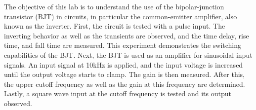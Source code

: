The objective of this lab is to understand the use of the bipolar-junction transistor (BJT) in circuits, in particular the common-emitter amplifier, also known as the inverter. First, the circuit is tested with a pulse input. The inverting behavior as well as the transients are observed, and the time delay, rise time, and fall time are measured. This experiment demonstrates the switching capabilities of the BJT. Next, the BJT is used as an amplifier for sinusoidal input signals. An input signal at 10kHz is applied, and the input voltage is increased until the output voltage starts to clamp. The gain is then measured. After this, the upper cutoff frequency as well as the gain at this frequency are determined. Lastly, a square wave input at the cutoff frequency is tested and its output observed. \\
